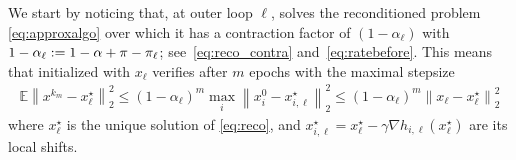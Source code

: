 We start by noticing that, at outer loop $\ell$, \salgo solves the reconditioned problem \eqref{eq:approxalgo} over which it has a contraction factor of $(1-\alpha_\ell)$ with $1-\alpha_\ell  := 1-\alpha+\pi - \pi_\ell$;
see~\eqref{eq:reco_contra} and~\eqref{eq:ratebefore}.%
This means that \salgo initialized with $x_\ell$ verifies after $m$ epochs with the maximal stepsize
    \begin{align*}
             \mathbb{E}   \left\| x^{k_m} - x_\ell^\star \right\|^2_2 \le \left( 1-\alpha_\ell  \right)^{m} \max_i\left\|x_i^0-x_{i,\ell}^\star\right\|^2_2 \le \left( 1-\alpha_\ell  \right)^{m} \left\|x_\ell -x_{\ell}^\star\right\|^2_2
    \end{align*}
    where $x_\ell^\star$ is the unique solution of \eqref{eq:reco}, and $x_{i,\ell}^\star = x_\ell^\star - \gamma \nabla h_{i,\ell}(x^\star_\ell)$ are its local shifts.
    
